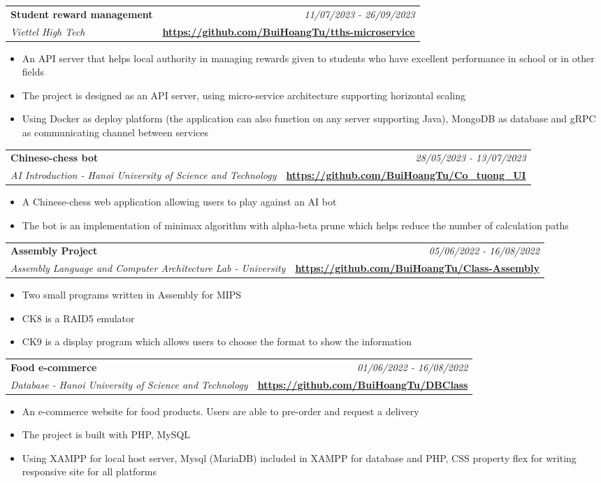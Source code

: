 \documentclass[a4paper,11pt]{article}
\makeatletter
\newcommand{\resumeProject}[4]{
\vspace{0.5mm}\item
    \begin{tabular*}{0.98\textwidth}[t]{l@{\extracolsep{\fill}}r}
        \textbf{#1} & \textit{\footnotesize{#3}} \\
        \footnotesize{\textit{#2}} & \footnotesize{#4}
    \end{tabular*}
    \vspace{-2.4mm}
}
\newcommand{\resumeItemListStart}{\begin{justify}\begin{itemize}[leftmargin=3ex, rightmargin=2ex, noitemsep,labelsep=1.2mm,itemsep=0mm]\small}
\newcommand{\resumeItemListEnd}{\end{itemize}\end{justify}\vspace{-2mm}}
\makeatother
\begin{document}
    \resumeProject
    {Student reward management} %
    {Viettel High Tech} %
    {11/07/2023 - 26/09/2023} %
    {\href{https://github.com/BuiHoangTu/tths-microservice}{\textbf{https://github.com/BuiHoangTu/tths-microservice}}} %
    \resumeItemListStart
    	\item {An API server that helps local authority in managing rewards given to students who have excellent performance in school or in other fields}
      	\item {The project is designed as an API server, using micro-service architecture supporting horizontal scaling}
      	\item {Using Docker as deploy platform (the application can also function on any server supporting Java), MongoDB as database and gRPC as communicating channel between services}
    \resumeItemListEnd
    \vspace{-1mm}
    
    \resumeProject
    {Chinese-chess bot}
    {AI Introduction - Hanoi University of Science and Technology}
    {28/05/2023 - 13/07/2023} 
    {\href{https://github.com/BuiHoangTu/Co_tuong_UI}{\textbf{https://github.com/BuiHoangTu/Co\_tuong\_UI}}}
    \resumeItemListStart
    	\item {A Chinese-chess web application allowing users to play against an AI bot}
    	\item {The bot is an implementation of minimax algorithm with alpha-beta prune which helps reduce the number of calculation paths}
    \resumeItemListEnd

    \resumeProject
    {Assembly Project}
    {Assembly Language and Computer Architecture Lab - University}
    {05/06/2022 - 16/08/2022} 
    {\href{https://github.com/BuiHoangTu/Class-Assembly}{\textbf{https://github.com/BuiHoangTu/Class-Assembly}}}
    \resumeItemListStart
    	\item {Two small programs written in Assembly for MIPS}
    	\item {CK8 is a RAID5 emulator}
    	\item {CK9 is a display program which allows users to choose the format to show the information }
    \resumeItemListEnd
    \resumeProject
    {Food e-commerce } %
    {Database - Hanoi University of Science and Technology} %
    {01/06/2022 - 16/08/2022} %
    {\href{https://github.com/BuiHoangTu/DBClass}{\textbf{https://github.com/BuiHoangTu/DBClass}}} %
    \resumeItemListStart
    	\item {An e-commerce website for food products. Users are able to pre-order and request a delivery}
        \item {The project is built with PHP, MySQL}
        \item  {Using XAMPP for local host server, Mysql (MariaDB) included in XAMPP for database and PHP, CSS property flex for writing responsive site for all platforms}
    \resumeItemListEnd
\end{document}
